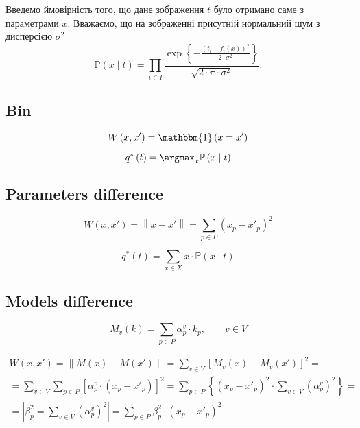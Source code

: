 Введемо ймовірність того,
що дане зображення $t$ було отримано саме з параметрами $x$.
Вважаємо, що на зображенні присутній нормальний шум з дисперсією $\sigma^2$
\begin{equation*}
  \mathbb{P}\left( x \mid t \right)
  = \prod_{i \in I}
    \frac{\exp{\left\{- \frac{\left( t_i - f_i\left( x \right) \right)^2}
           {2 \cdot \sigma^2} \right\}}}
           {\sqrt{2 \cdot \pi \cdot \sigma^2}}.
\end{equation*}

\subsection{Bin}

\begin{equation*}
  W \left( x, x' \right)
  = \mathbbm{1} \left( x = x' \right)
\end{equation*}

\begin{equation*}
  q^* \left( t \right)
  = \argmax_x \mathbb{P} \left( x \mid  t \right)
\end{equation*}

\subsection{Parameters difference}

\begin{equation*}
  W \left( x, x' \right)
  = \left\| x - x' \right\|
  = \sum_{p \in P} \left( x_p - x'_p \right)^2
\end{equation*}

\begin{equation*}
  q^* \left( t \right)
  = \sum_{x \in X} x \cdot \mathbb{P}\left( x \mid t \right)
\end{equation*}

\subsection{Models difference}

\begin{equation*}
  M_v\left( k \right) = \sum_{p \in P} \alpha_p^v \cdot k_p, \qquad v \in V
\end{equation*}

\begin{equation*}
    \begin{split}
      W \left( x, x' \right)
      = \left\| M\left( x \right) - M\left( x' \right) \right\|
      = \sum_{v \in V} \left[
          M_v\left( x \right) - M_v\left( x' \right)
        \right]^2 = \\
      = \sum_{v \in V} \sum_{p \in P} \left[
          \alpha_p^v \cdot \left( x_p - x'_p \right)
        \right]^2
      = \sum_{p \in P} \left\{ \left( x_p - x'_p \right)^2
        \cdot \sum_{v \in V} \left( \alpha_p^v \right)^2 \right\} = \\
      = \left| \beta_p^2 = \sum_{v \in V} \left( \alpha_p^v \right)^2 \right|
      = \sum_{p \in P}
          \beta_p^2 \cdot \left( x_p - x'_p \right)^2
    \end{split}
\end{equation*}

